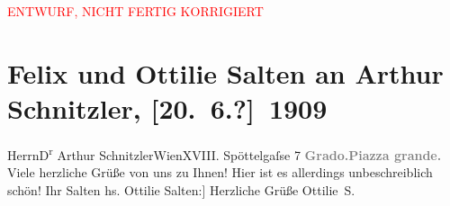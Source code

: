 
\begin{center}
            \textcolor{red}{ENTWURF, NICHT FERTIG KORRIGIERT}
                      \end{center}
            
         \renewcommand{\erwaehnteOrte}{Orte: Edmund-Weiß-Gasse, Grado, Piazza Duca D’Aosta, Wien}
         \renewcommand{\erwaehnteWerke}{}
               \section[Felix und Ottilie Salten an Arthur Schnitzler, {[}20. 6.?{]} 1909]{ Felix und Ottilie Salten an Arthur Schnitzler, {[}20. 6.?{]} 1909}\nopagebreak{}\rehead{ }\begin{ledgroupsized}[t]{13cm}\normalsize\beginnumbering \toendnotes[C]{\smallbreak\pagebreak[2]} 
\pstart{}{\pb}Herrn\pend{}\pstart{}D\textsuperscript{r} Arthur Schnitzler\pend{}\pstart{}Wien\pend{}\pstart{}XVIII. Spöttelgaſse 7\pend{}{\bigskip}\pstart
           \noindent{}\centering{}{\pb}\textcolor{gray}{\textbf{Grado.\hspace*{5em}Piazza grande.}}\pend
           \pstart
           Viele herzliche Grüße von uns zu Ihnen! Hier ist es allerdings unbeschreiblich
               schön!\pend
           \pstart Ihr \spacefill\mbox{Salten}\pend{}{\bigskip}\pstart
           \noindent{}{[}hs. Ottilie Salten:{]} Herzliche Grüße\pend
           \pstart \spacefill\mbox{Ottilie S.}\pend{}
         
         \endnumbering{}\end{ledgroupsized}\begin{anhang}\end{anhang}\newcommand{\dateiname}{L03499}\newcommand{\titel}{Felix und Ottilie Salten an Arthur Schnitzler, [20. 6.?] 1909}\newcommand{\editorInnen}{Martin Anton Müller und Laura Untner}
      